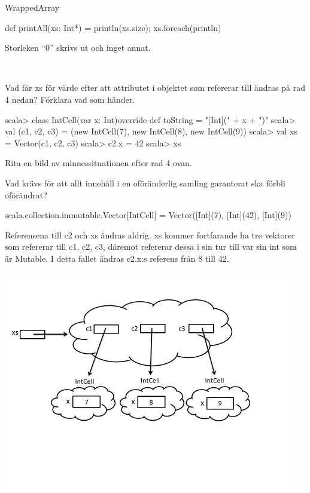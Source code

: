 \SubtaskSolved  WrappedArray

\SubtaskSolved  def printAll(xs: Int*) = {println(xs.size); xs.foreach(println)}

\SubtaskSolved  Storleken “0” skrivs ut och inget annat.




\QUESTEND









\QUESTBEGIN

\Task  \what~

\Subtask Vad får xs för värde efter att attributet i objektet som  refererar till ändras på rad 4 nedan? Förklara vad som händer.
\begin{REPL}
scala> class IntCell(var x: Int){override def toString = "[Int](" + x + ")"}
scala> val (c1, c2, c3) = (new IntCell(7), new IntCell(8), new IntCell(9))
scala> val xs = Vector(c1, c2, c3)
scala> c2.x = 42
scala> xs
\end{REPL}

\Subtask\Pen Rita en bild av minnessituationen efter rad 4 ovan.

\Subtask\Pen Vad krävs för att allt innehåll i en oföränderlig samling garanterat ska förbli oförändrat?

\SOLUTION


\TaskSolved \what


\SubtaskSolved  \begin{REPL}
scala.collection.immutable.Vector[IntCell] =
    Vector([Int](7), [Int](42), [Int](9))
\end{REPL}
Referensena till c2 och xs ändras aldrig.
xs kommer fortfarande ha tre vektorer som refererar till c1, c2, c3, däremot refererar dessa i sin tur till var sin int som är Mutable.
I detta fallet ändras c2.x:s referens från 8 till 42.

\SubtaskSolved  \includegraphics{../img/w05-solutions/memory-pic-1}

